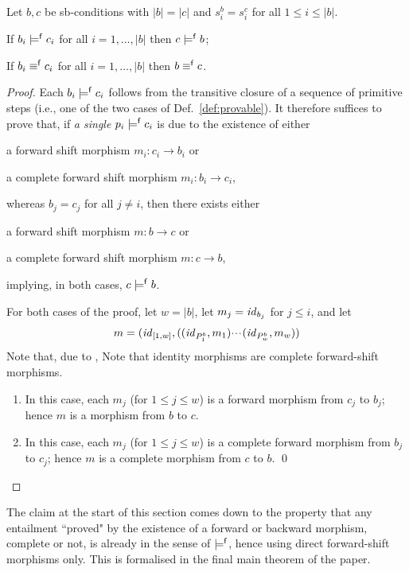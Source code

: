 \begin{proposition}
Let $b,c$ be sb-conditions with $|b|=|c|$ and $s^b_i=s^c_i$ for all $1\leq i\leq |b|$.
\begin{enumerateS}
\item If $b_i\models^{\mathsf f} c_i$ for all $i=1,\ldots,|b|$ then $c\models^{\mathsf f} b$;
\item If $b_i\equiv^{\mathsf f} c_i$ for all $i=1,\ldots,|b|$ then $b\equiv^{\mathsf f} c$.
\end{enumerateS}
\end{proposition}
%
\begin{proof}
Each $b_i\models^{\mathsf f} c_i$ follows from the transitive closure of a sequence of primitive steps (i.e., one of the two cases of Def.~\ref{def:provable}). It therefore suffices to prove that, if \emph{a single} $p_i\models^{\mathsf f} c_i$ is due to the existence of either
\begin{inumerate}
\item a forward shift morphism $m_i:c_i\to b_i$ or
\item a complete forward shift morphism $m_i:b_i\to c_i$,
\end{inumerate}
whereas $b_j=c_j$ for all $j\neq i$, then there exists either
\begin{inumerate}
\item a forward shift morphism $m:b\to c$ or 
\item a complete forward shift morphism $m:c\to b$,
\end{inumerate}
implying, in both cases, $c\models^{\mathsf f} b$.

\smallskip
For both cases of the proof, let $w=|b|$, let $m_j=\mathit{id}_{b_j}$ for $j\leq i$, and let
%
\[ m = (\mathit{id}_{[1,w]},((\mathit{id}_{P^b_1},m_1){\cdotp\mkern-2mu\cdotp\mkern-2mu\cdotp\mkern1mu} (\mathit{id}_{P^b_w},m_w)) \]
%
\iffull
Note that, due to ,
\else
Note that 
\fi
identity morphisms are complete forward-shift morphisms.
%
\begin{enumerate}[label=\emph{(\roman*)}]
\item In this case, each $m_j$ (for $1\leq j\leq w$) is a forward morphism from $c_j$ to $b_j$; hence $m$ is a morphism from $b$ to $c$.

\item In this case, each $m_j$ (for $1\leq j\leq w$) is a complete forward morphism from $b_j$ to $c_j$; hence $m$ is a complete morphism from $c$ to $b$.
\qed
\end{enumerate}
\end{proof}
%
The claim at the start of this section comes down to the property that any entailment ``proved" by the existence of a forward or backward morphism, complete or not, is already {\fprovable} in the sense of $\models^{\mathsf f}$, hence using direct forward-shift morphisms only. This is formalised in the final main theorem of the paper.

